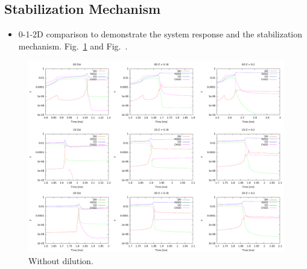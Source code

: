 \documentclass[11pt,english]{article}
\begin{document}
\subsection{Stabilization Mechanism}
\begin{itemize}
  \item 0-1-2D comparison to demonstrate the system response and the stabilization mechanism.  Fig.~\ref{fig:LFA_800_nodil} and Fig.~\cite{fig:LFA_800_dilution}.
\end{itemize}
\begin{figure}[t]
      \centering
      \scriptsize
      \includegraphics[width=1.0\textwidth]{800_nodil_012D.pdf}
      \normalsize
      \caption{Without dilution.}
      \label{fig:LFA_800_nodil}
    \end{figure} 
\end{document}
